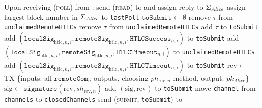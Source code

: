 \begin{algorithmic}[1]
    \State Upon receiving (\textsc{poll}) from \environment:
    \Indent
      \State send (\textsc{read}) to \ledger{} and assign reply to
      $\Sigma_{\mathit{Alice}}$
      \State assign largest block number in $\Sigma_{\mathit{Alice}}$ to
      \texttt{lastPoll}
      \State $\mathtt{toSubmit} \gets \emptyset$
         
          \State remove $\tau$ from \texttt{unclaimedRemoteHTLCs}
          \State remove $\tau$ from \texttt{unclaimedRemoteHTLCs}
          \State add $\tau$ to \texttt{toSubmit}
        \EndIf
      \EndFor
         
            \State add $\left(\mathtt{localSig}_{\mathrm{htlc}, n, i},
            \mathtt{remoteSig}_{\mathrm{htlc}, n, i}, \mathtt{HTLCSuccess}_{n,
            i}\right)$ to \texttt{toSubmit}
          \EndFor
              \State add $\left(\mathtt{localSig}_{\mathrm{htlc}, n, i},
              \mathtt{remoteSig}_{\mathrm{htlc}, n, i},
              \mathtt{HTLCTimeout}_{n, i}\right)$ to
              \texttt{unclaimedRemoteHTLCs}
              \State add $\left(\mathtt{localSig}_{\mathrm{htlc}, n, i},
              \mathtt{remoteSig}_{\mathrm{htlc}, n, i},
              \mathtt{HTLCTimeout}_{n, i}\right)$ to \texttt{toSubmit}
            \EndIf
          \EndFor
        \Else {}
          \State $\mathrm{rev} \gets$ TX \{inputs: all $\mathtt{remoteCom}_n$
          outputs, choosing $ph_{\mathrm{rev}, n}$ method, output:
          $pk_{\mathit{Alice}}$\}
          \State $\mathrm{sig} \gets \mathtt{signature}\left(\mathrm{rev},
          sh_{\mathrm{rev}, n}\right)$
          \State add $\left(\mathrm{sig}, \mathrm{rev}\right)$ to
          \texttt{toSubmit}
        \EndIf
        \State move \texttt{channel} from \texttt{channels} to
        \texttt{closedChannels}
      \EndFor
      \State send (\textsc{submit}, \texttt{toSubmit}) to \ledger
    \EndIndent
    \State


\end{algorithmic}
